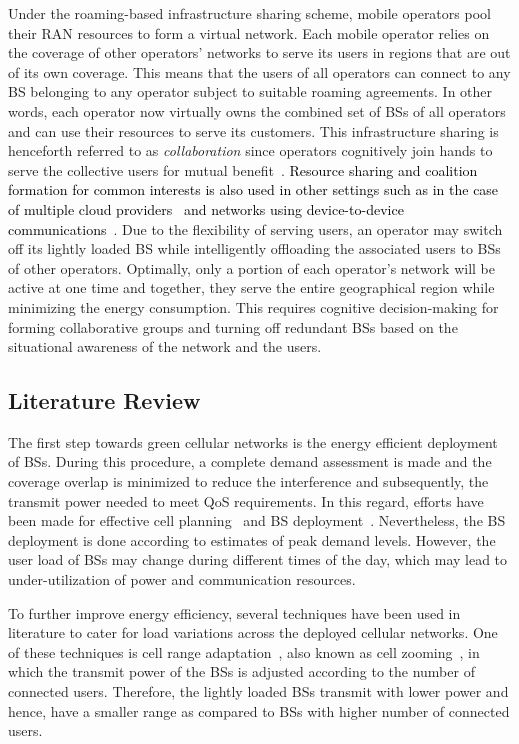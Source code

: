 \documentclass[10pt, letter, twocolumn]{IEEEtran}
\begin{document}
Under the roaming-based infrastructure sharing scheme, mobile operators pool their RAN resources to form a virtual network. Each mobile operator relies on the coverage of other operators' networks to serve its users in regions that are out of its own coverage. This means that the users of all operators can connect to any BS belonging to any operator subject to suitable roaming agreements. In other words, each operator now virtually owns the combined set of BSs of all operators and can use their resources to serve its customers. This infrastructure sharing is henceforth referred to as \emph{collaboration} since operators cognitively join hands to serve the collective users for mutual benefit~\cite{7294664}. \textcolor{black}{Resource sharing and coalition formation for common interests is also used in other settings such as in the case of multiple cloud providers~\cite{greedy_ref_3} and networks using device-to-device communications~\cite{greedY_ref_2}}. Due to the flexibility of serving users, an operator may switch off its lightly loaded BS while intelligently offloading the associated users to BSs of other operators. Optimally, only a portion of each operator's network will be active at one time and together, they serve the entire geographical region while minimizing the energy consumption. This requires cognitive decision-making for forming collaborative groups and turning off redundant BSs based on the situational awareness of the network and the users.
\subsection{Literature Review}
\label{sec2}
The first step towards green cellular networks is the energy efficient deployment of BSs. During this procedure, a complete demand assessment is made and the coverage overlap is minimized to reduce the interference and subsequently, the transmit power needed to meet QoS requirements. In this regard, efforts have been made for effective cell planning~\cite{7056465} and BS deployment~\cite{deployment1}. Nevertheless, the BS deployment is done according to estimates of peak demand levels. However, the user load of BSs may change during different times of the day, which may lead to under-utilization of power and communication resources.

To further improve energy efficiency, several techniques have been used in literature to cater for load variations across the deployed cellular networks. One of these techniques is cell range adaptation~\cite{range_adaptation}, also known as cell zooming~\cite{cell_zooming}, in which the transmit power of the BSs is adjusted according to the number of connected users. Therefore, the lightly loaded BSs transmit with lower power and hence, have a smaller range as compared to BSs with higher number of connected users.
\end{document}
